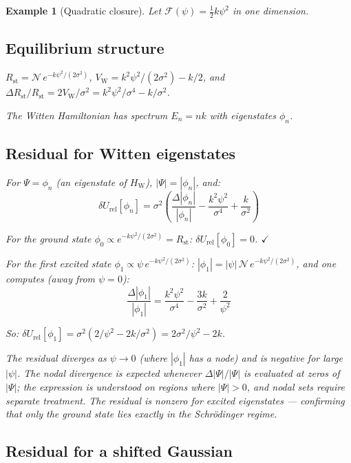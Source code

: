 \documentclass[12pt]{article}
\newtheorem{example}[theorem]{Example}
\newcommand{\Fcal}{\mathcal{F}}
\newcommand{\VW}{V_{\mathrm{W}}}
\newcommand{\HW}{H_{\mathrm{W}}}
\newcommand{\Rst}{R_{\mathrm{st}}}
\newcommand{\dUrel}{\delta U_{\mathrm{rel}}}
\begin{document}
\begin{example}[Quadratic closure]\label{ex:quadratic}
Let $\Fcal(\psi) = \frac{1}{2}k\psi^2$ in one dimension.

\subsection*{Equilibrium structure}

$\Rst = \mathcal{N}\,e^{-k\psi^2/(2\sigma^2)}$, $\VW = k^2\psi^2/(2\sigma^2) - k/2$, and $\Delta\Rst/\Rst = 2\VW/\sigma^2 = k^2\psi^2/\sigma^4 - k/\sigma^2$.

The Witten Hamiltonian has spectrum $E_n = nk$ with eigenstates $\phi_n$.

\subsection*{Residual for Witten eigenstates}

For $\Psi = \phi_n$ (an eigenstate of $\HW$), $|\Psi| = |\phi_n|$, and:
\begin{equation}
    \dUrel[\phi_n] = \sigma^2\left(\frac{\Delta|\phi_n|}{|\phi_n|} - \frac{k^2\psi^2}{\sigma^4} + \frac{k}{\sigma^2}\right)
\end{equation}

For the ground state $\phi_0 \propto e^{-k\psi^2/(2\sigma^2)} = \Rst$: $\dUrel[\phi_0] = 0$. $\checkmark$

For the first excited state $\phi_1 \propto \psi\,e^{-k\psi^2/(2\sigma^2)}$: $|\phi_1| = |\psi|\,\mathcal{N}\,e^{-k\psi^2/(2\sigma^2)}$, and one computes (away from $\psi = 0$):
\begin{equation}
    \frac{\Delta|\phi_1|}{|\phi_1|} = \frac{k^2\psi^2}{\sigma^4} - \frac{3k}{\sigma^2} + \frac{2}{\psi^2}
\end{equation}

So: $\dUrel[\phi_1] = \sigma^2(2/\psi^2 - 2k/\sigma^2) = 2\sigma^2/\psi^2 - 2k$.

The residual diverges as $\psi \to 0$ (where $|\phi_1|$ has a node) and is negative for large $|\psi|$. The nodal divergence is expected whenever $\Delta|\Psi|/|\Psi|$ is evaluated at zeros of $|\Psi|$; the expression is understood on regions where $|\Psi| > 0$, and nodal sets require separate treatment. The residual is nonzero for excited eigenstates --- confirming that only the ground state lies exactly in the Schr\"odinger regime.

\subsection*{Residual for a shifted Gaussian}


\end{example}
\end{document}
